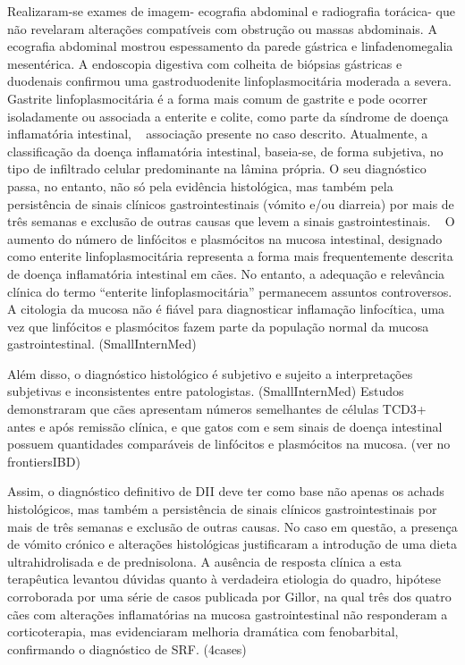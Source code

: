 Realizaram-se exames de imagem- ecografia abdominal e radiografia torácica- que não revelaram alterações compatíveis com obstrução ou massas abdominais. A ecografia abdominal mostrou espessamento da parede gástrica e linfadenomegalia mesentérica.  A endoscopia digestiva com colheita de biópsias gástricas e duodenais confirmou uma gastroduodenite linfoplasmocitária moderada a severa. Gastrite linfoplasmocitária é a forma mais comum de gastrite e pode ocorrer isoladamente ou associada a enterite e colite, como parte da síndrome de doença inflamatória intestinal, ~\cite{Amorim2016} associação presente no caso descrito. Atualmente, a classificação da doença inflamatória intestinal, baseia-se, de forma subjetiva, no tipo de infiltrado celular predominante na lâmina própria. O seu diagnóstico passa, no entanto, não só pela evidência histológica, mas também pela persistência de sinais clínicos gastrointestinais (vómito e/ou diarreia) por mais de três semanas e exclusão de outras causas que levem a sinais gastrointestinais. ~\cite{Jergens2012} O aumento do número de linfócitos e plasmócitos na mucosa intestinal, designado como enterite linfoplasmocitária representa a forma mais frequentemente descrita de doença inflamatória intestinal em cães. No entanto, a adequação e relevância clínica do termo “enterite linfoplasmocitária” permanecem assuntos controversos. A citologia da mucosa não é fiável para diagnosticar inflamação linfocítica, uma vez que linfócitos e plasmócitos fazem parte da população normal da mucosa gastrointestinal. (SmallInternMed) 

Além disso, o diagnóstico histológico é subjetivo e sujeito a interpretações subjetivas e inconsistentes entre patologistas. (SmallInternMed) Estudos demonstraram que cães apresentam números semelhantes de células TCD3+ antes e após remissão clínica, e que gatos com e sem sinais de doença intestinal possuem quantidades comparáveis de linfócitos e plasmócitos na mucosa. (ver no frontiersIBD) 


Assim, o diagnóstico definitivo de DII deve ter como base não apenas os achads histológicos, mas também a persistência de sinais clínicos gastrointestinais por mais de três semanas e exclusão de outras causas. No caso em questão, a presença de vómito crónico e alterações histológicas justificaram a introdução de uma dieta ultrahidrolisada e de prednisolona. A ausência de resposta clínica a esta terapêutica levantou dúvidas quanto à verdadeira etiologia do quadro, hipótese corroborada por uma série de casos publicada por Gillor, na qual três dos quatro cães com alterações inflamatórias na mucosa gastrointestinal não responderam a corticoterapia, mas evidenciaram melhoria dramática com fenobarbital, confirmando o diagnóstico de SRF. (4cases)



